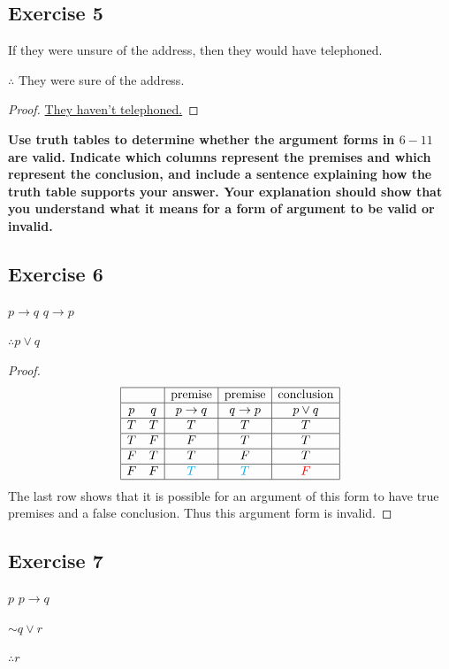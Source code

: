 \documentclass[14pt]{extarticle}
\begin{document}
\subsection{Exercise 5} If they were unsure of the address, then they would have
telephoned.

\fbl

$\therefore$ They were sure of the address.

\begin{proof} \underline{They haven't telephoned.} \end{proof}
{\bf \color{cyan} Use truth tables to determine whether the argument forms in
$6-11$ are valid. Indicate which columns represent the premises and which
represent the conclusion, and include a sentence explaining how the truth table
supports your answer. Your explanation should show that you understand what it
means for a form of argument to be valid or invalid.}

\subsection{Exercise 6} $p \to q$
$q \to p$

$\therefore p \vee q$

\begin{proof} $$ \begin{array}{|cc|c|c|c|} \hline & & \text{premise} &
\text{premise} & \text{conclusion} \\ \hline p & q & p \to q & q \to p & p \vee
q \\ \hline T & T & T & T & T \\ \hline T & F & F & T & T \\ \hline F & T & T &
F & T \\ \hline F & F & \color{cyan} T & \color{cyan} T & \color{red} F \\
\hline \end{array} $$ The last row shows that it is possible for an argument of
this form to have true premises and a false conclusion. Thus this argument form
is invalid. \end{proof}

\subsection{Exercise 7} $p$
$p \to q$

${\sim q} \vee r$

$\therefore r$
\end{document}
